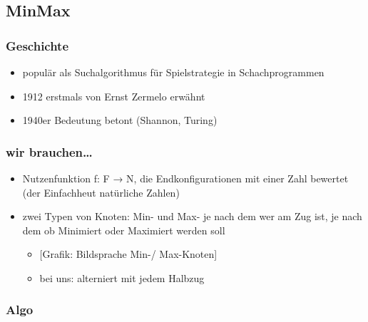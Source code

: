 \documentclass[]{article}
\begin{document}
\hypertarget{header-n461}{%
\subsection{MinMax}\label{header-n461}}

\hypertarget{header-n464}{%
\subsubsection{Geschichte}\label{header-n464}}

\begin{itemize}
\item
  populär als Suchalgorithmus für Spielstrategie in Schachprogrammen
\item
  1912 erstmals von Ernst Zermelo erwähnt
\item
  1940er Bedeutung betont (Shannon, Turing)
\end{itemize}

\hypertarget{header-n490}{%
\subsubsection{wir brauchen\ldots{}}\label{header-n490}}

\begin{itemize}
\item
  Nutzenfunktion f: F → N, die Endkonfigurationen mit einer Zahl
  bewertet (der Einfachheut natürliche Zahlen)
\item
  zwei Typen von Knoten: Min- und Max- je nach dem wer am Zug ist, je
  nach dem ob Minimiert oder Maximiert werden soll

  \begin{itemize}
  \item
    {[}Grafik: Bildsprache Min-/ Max-Knoten{]}
  \item
    bei uns: alterniert mit jedem Halbzug
  \end{itemize}
\end{itemize}

\hypertarget{header-n660}{%
\subsubsection{Algo}\label{header-n660}}
\end{document}
